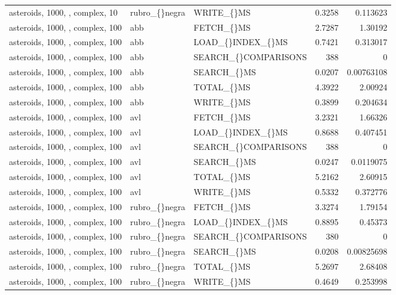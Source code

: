\begin{longtable}{p{4cm}p{1.4cm}p{2.6cm}rr}
asteroids, 1000, , complex, 10 & rubro\_\allowbreak\{\}negra & WRITE\_\allowbreak\{\}MS & 0.3258 & 0.113623\\
asteroids, 1000, , complex, 100 & abb & FETCH\_\allowbreak\{\}MS & 2.7287 & 1.30192\\
asteroids, 1000, , complex, 100 & abb & LOAD\_\allowbreak\{\}INDEX\_\allowbreak\{\}MS & 0.7421 & 0.313017\\
asteroids, 1000, , complex, 100 & abb & SEARCH\_\allowbreak\{\}COMPARISONS & 388 & 0\\
asteroids, 1000, , complex, 100 & abb & SEARCH\_\allowbreak\{\}MS & 0.0207 & 0.00763108\\
asteroids, 1000, , complex, 100 & abb & TOTAL\_\allowbreak\{\}MS & 4.3922 & 2.00924\\
asteroids, 1000, , complex, 100 & abb & WRITE\_\allowbreak\{\}MS & 0.3899 & 0.204634\\
asteroids, 1000, , complex, 100 & avl & FETCH\_\allowbreak\{\}MS & 3.2321 & 1.66326\\
asteroids, 1000, , complex, 100 & avl & LOAD\_\allowbreak\{\}INDEX\_\allowbreak\{\}MS & 0.8688 & 0.407451\\
asteroids, 1000, , complex, 100 & avl & SEARCH\_\allowbreak\{\}COMPARISONS & 388 & 0\\
asteroids, 1000, , complex, 100 & avl & SEARCH\_\allowbreak\{\}MS & 0.0247 & 0.0119075\\
asteroids, 1000, , complex, 100 & avl & TOTAL\_\allowbreak\{\}MS & 5.2162 & 2.60915\\
asteroids, 1000, , complex, 100 & avl & WRITE\_\allowbreak\{\}MS & 0.5332 & 0.372776\\
asteroids, 1000, , complex, 100 & rubro\_\allowbreak\{\}negra & FETCH\_\allowbreak\{\}MS & 3.3274 & 1.79154\\
asteroids, 1000, , complex, 100 & rubro\_\allowbreak\{\}negra & LOAD\_\allowbreak\{\}INDEX\_\allowbreak\{\}MS & 0.8895 & 0.45373\\
asteroids, 1000, , complex, 100 & rubro\_\allowbreak\{\}negra & SEARCH\_\allowbreak\{\}COMPARISONS & 380 & 0\\
asteroids, 1000, , complex, 100 & rubro\_\allowbreak\{\}negra & SEARCH\_\allowbreak\{\}MS & 0.0208 & 0.00825698\\
asteroids, 1000, , complex, 100 & rubro\_\allowbreak\{\}negra & TOTAL\_\allowbreak\{\}MS & 5.2697 & 2.68408\\
asteroids, 1000, , complex, 100 & rubro\_\allowbreak\{\}negra & WRITE\_\allowbreak\{\}MS & 0.4649 & 0.253998\\

\end{longtable}
